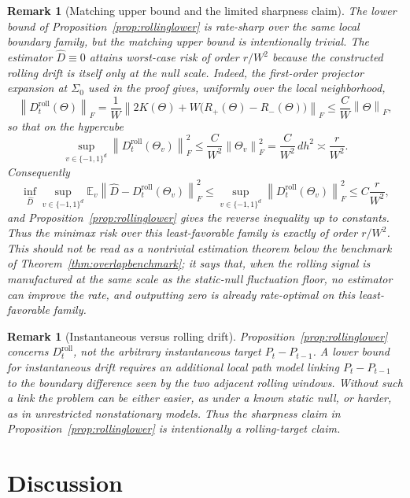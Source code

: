 \documentclass[11pt]{article}
\theoremstyle{tightplain}
\theoremstyle{tightdef}
\newtheorem{remark}[theorem]{Remark}
\newcommand{\E}{\mathbb E}
\newcommand{\norm}[1]{\left\lVert #1 \right\rVert}
\begin{document}
\begin{remark}[Matching upper bound and the limited sharpness claim]\label{rem:matchingupper}
The lower bound of Proposition~\ref{prop:rollinglower} is rate-sharp over the
same local boundary family, but the matching upper bound is intentionally
trivial. The estimator $\widehat D\equiv0$ attains worst-case risk of order
$r/W^2$ because the constructed rolling drift is itself only at the null scale.
Indeed, the first-order projector expansion at $\Sigma_0$ used in the proof
gives, uniformly over the local neighborhood,
\[
\norm{D_t^{\mathrm{roll}}(\Theta)}_F
=\frac1W\norm{2K(\Theta)+W\bigl(R_+(\Theta)-R_-(\Theta)\bigr)}_F
\le
\frac{C}{W}\norm{\Theta}_F,
\]
so that on the hypercube
\[
\sup_{v\in\{-1,1\}^d}\norm{D_t^{\mathrm{roll}}(\Theta_v)}_F^2
\le
\frac{C}{W^2}\norm{\Theta_v}_F^2
=\frac{C}{W^2}\,d h^2
\asymp\frac r{W^2}.
\]
Consequently
\[
\inf_{\widehat D}\sup_{v\in\{-1,1\}^d}
\E_v\norm{\widehat D-D_t^{\mathrm{roll}}(\Theta_v)}_F^2
\le
\sup_{v\in\{-1,1\}^d}\norm{D_t^{\mathrm{roll}}(\Theta_v)}_F^2
\le
C\frac r{W^2},
\]
and Proposition~\ref{prop:rollinglower} gives the reverse inequality up to
constants. Thus the minimax risk over this least-favorable family is exactly of
order $r/W^2$. This should not be read as a nontrivial estimation theorem below
the benchmark of Theorem~\ref{thm:overlapbenchmark}; it says that, when the
rolling signal is manufactured at the same scale as the static-null
fluctuation floor, no estimator can improve the rate, and outputting zero is
already rate-optimal on this least-favorable family.
\end{remark}

\begin{remark}[Instantaneous versus rolling drift]\label{rem:instantaneousvsrolling}
Proposition~\ref{prop:rollinglower} concerns $D_t^{\mathrm{roll}}$, not the
arbitrary instantaneous target $P_t-P_{t-1}$. A lower bound for instantaneous
drift requires an additional local path model linking $P_t-P_{t-1}$ to the
boundary difference seen by the two adjacent rolling windows. Without such a
link the problem can be either easier, as under a known static null, or harder,
as in unrestricted nonstationary models. Thus the sharpness claim in
Proposition~\ref{prop:rollinglower} is intentionally a rolling-target claim.
\end{remark}

\section{Discussion}
\end{document}
